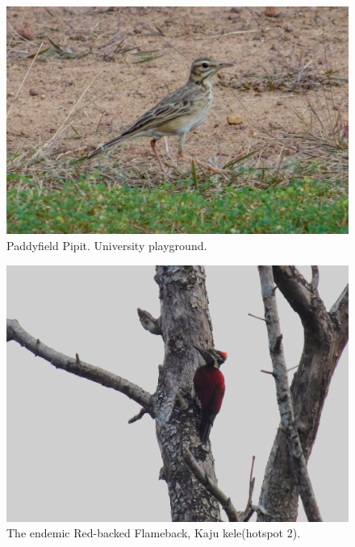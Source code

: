 \begin{figure}[!htpb]
    \centering
    \includegraphics[width=\linewidth]{Figures/pipit.JPG}
    \caption[]{Paddyfield Pipit. University playground.}
    \label{fig:figure-01}
\end{figure}
\begin{figure}[!htpb]
    \centering
    \includegraphics[width=\linewidth]{Figures/flameback.JPG}
    \caption[]{The endemic Red-backed Flameback, Kaju kele(hotspot 2).}
    \label{fig:figure-01}
\end{figure}
